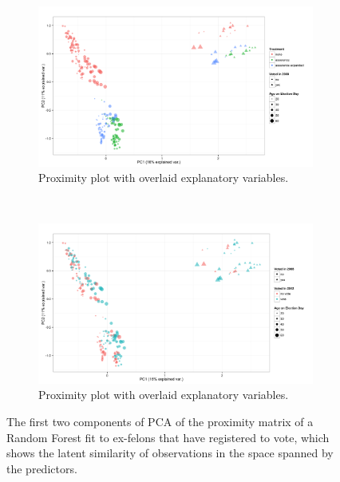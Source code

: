 \begin{figure}
        \centering
        \begin{subfigure}[b]{0.7\textwidth}
                \includegraphics[width=\textwidth]{figures/prox_cond_vote_top.png}
                \caption{Proximity plot with overlaid explanatory variables.}
                \label{fig:prox_top}
        \end{subfigure}%
        ~ %

        \begin{subfigure}[b]{0.7\textwidth}
                \includegraphics[width=\textwidth]{figures/prox_cond_vote_bottom.png}
                \caption{Proximity plot with overlaid explanatory variables.}
                \label{fig:prox_bottom}
        \end{subfigure}
        \caption{The first two components of PCA of the proximity matrix of a Random Forest fit to ex-felons that have registered to vote, which shows the latent similarity of observations in the space spanned by the predictors.}
        \label{fig:prox}
\end{figure}
